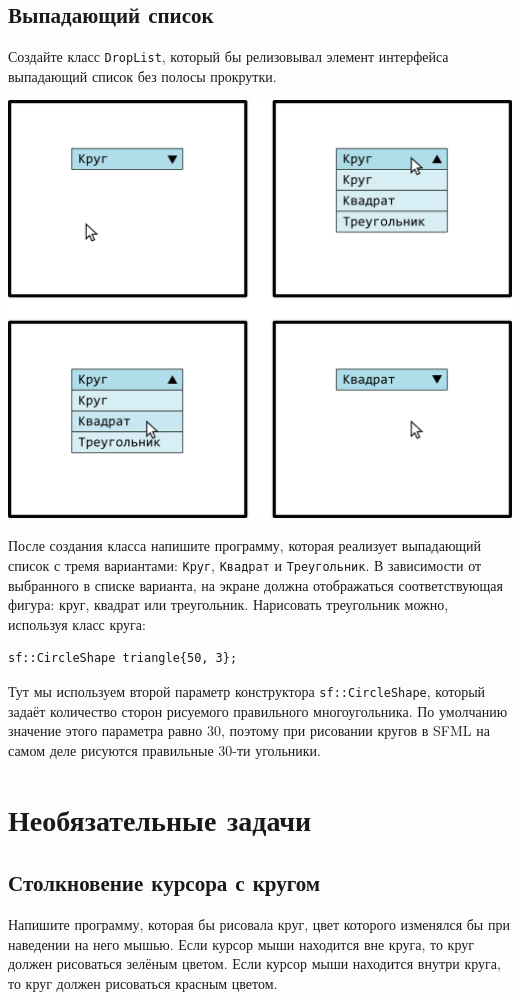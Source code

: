 \documentclass{article}
\begin{document}
\subsection{Выпадающий список}
Создайте класс \texttt{DropList}, который бы релизовывал элемент интерфейса выпадающий список без полосы прокрутки.
\begin{center}
\includegraphics[scale=1]{../images/drop_down_list.png}
\end{center}
После создания класса напишите программу, которая реализует выпадающий список с тремя вариантами: \texttt{Круг}, \texttt{Квадрат} и \texttt{Треугольник}. В зависимости от выбранного в списке варианта, на экране должна отображаться соответствующая фигура: круг, квадрат или треугольник. Нарисовать треугольник можно, используя класс круга: 
\begin{lstlisting}
sf::CircleShape triangle{50, 3};
\end{lstlisting}
Тут мы используем второй параметр конструктора \texttt{sf::CircleShape}, который задаёт количество сторон рисуемого правильного многоугольника. По умолчанию значение этого параметра равно 30, поэтому при рисовании кругов в SFML на самом деле рисуются правильные 30-ти угольники.

\newpage
\section{Необязательные задачи}

\subsection{Столкновение курсора с кругом}
Напишите программу, которая бы рисовала круг, цвет которого изменялся бы при наведении на него мышью. Если курсор мыши находится вне круга, то круг должен рисоваться зелёным цветом. Если курсор мыши находится внутри круга, то круг должен рисоваться красным цветом.
\end{document}
